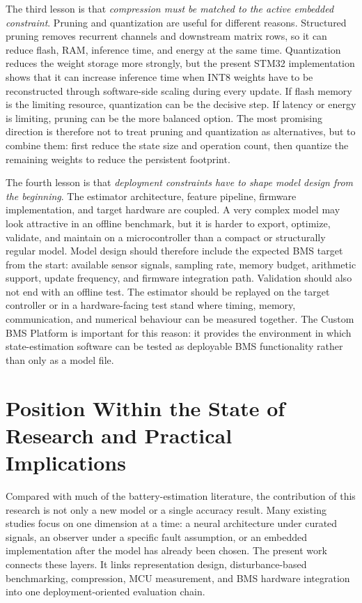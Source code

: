\documentclass[
    a4paper,
    12pt,
    titlepage,
    bibliography=totoc,
    twoside=on,
    parskip=false,
    numbers=noenddot,
    cleardoublepage=empty,
    DIV=12,
    BCOR=12.0mm,
    headheight=36pt,
    headings=openright
]{scrreprt}
\begin{document}
The third lesson is that \emph{compression must be matched to the active embedded constraint}. Pruning and quantization are useful for different reasons. Structured pruning removes recurrent channels and downstream matrix rows, so it can reduce flash, RAM, inference time, and energy at the same time. Quantization reduces the weight storage more strongly, but the present STM32 implementation shows that it can increase inference time when INT8 weights have to be reconstructed through software-side scaling during every update. If flash memory is the limiting resource, quantization can be the decisive step. If latency or energy is limiting, pruning can be the more balanced option. The most promising direction is therefore not to treat pruning and quantization as alternatives, but to combine them: first reduce the state size and operation count, then quantize the remaining weights to reduce the persistent footprint.

The fourth lesson is that \emph{deployment constraints have to shape model design from the beginning}. The estimator architecture, feature pipeline, firmware implementation, and target hardware are coupled. A very complex model may look attractive in an offline benchmark, but it is harder to export, optimize, validate, and maintain on a microcontroller than a compact or structurally regular model. Model design should therefore include the expected BMS target from the start: available sensor signals, sampling rate, memory budget, arithmetic support, update frequency, and firmware integration path. Validation should also not end with an offline test. The estimator should be replayed on the target controller or in a hardware-facing test stand where timing, memory, communication, and numerical behaviour can be measured together. The Custom BMS Platform is important for this reason: it provides the environment in which state-estimation software can be tested as deployable BMS functionality rather than only as a model file.

\section{Position Within the State of Research and Practical Implications}
Compared with much of the battery-estimation literature, the contribution of this research is not only a new model or a single accuracy result. Many existing studies focus on one dimension at a time: a neural architecture under curated signals, an observer under a specific fault assumption, or an embedded implementation after the model has already been chosen. The present work connects these layers. It links representation design, disturbance-based benchmarking, compression, MCU measurement, and BMS hardware integration into one deployment-oriented evaluation chain.
\end{document}
